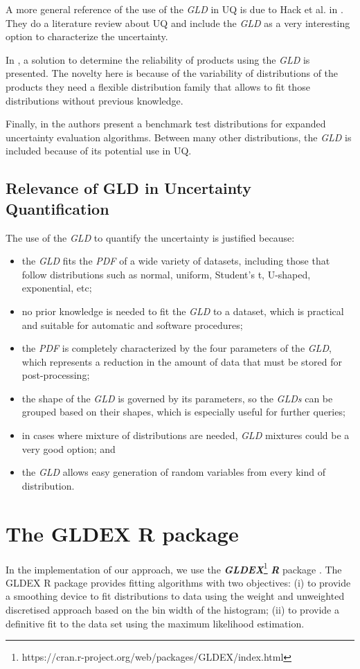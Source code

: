 A more general reference of the use of the \textit{GLD} in UQ is due to Hack et al. in \cite{da2012measurement}. They do a literature review about UQ and include the \textit{GLD} as a very interesting option to characterize the uncertainty.

In \cite{Movahedi2013}, a solution to determine the reliability of products using the \textit{GLD} is presented. The novelty here is because of the variability of distributions of the products they need a flexible distribution family that allows to fit those distributions without previous knowledge.

Finally, in \cite{Rajan2016} the authors present a benchmark test distributions for expanded uncertainty evaluation algorithms. Between many other distributions, the \textit{GLD} is included because of its potential use in UQ. 

\subsection{Relevance of GLD in Uncertainty Quantification}
The use of the \textit{GLD} to quantify the uncertainty is justified because: 
\begin{itemize}
\item the \textit{GLD} fits the \textit{PDF} of a wide variety of datasets, including those that follow distributions such as normal, uniform, Student's t, U-shaped, exponential, etc;
\item no prior knowledge is needed to fit the \textit{GLD} to a dataset, which is practical and suitable for automatic and software procedures;
\item the \textit{PDF} is completely characterized by the four parameters of the \textit{GLD}, which represents a reduction in the amount of data that must be stored for post-processing;
\item the shape of the \textit{GLD} is governed by its parameters, so the \textit{GLDs} can be grouped  based on their shapes, which is especially useful for further queries;
\item in cases where mixture of distributions are needed, \textit{GLD} mixtures could be a very good option; and
\item the \textit{GLD} allows easy generation of random variables from every kind of distribution.
\end{itemize}

\section{The GLDEX R package}\label{sec:gldex}
In the implementation of our approach, we use the \textbf{\textit{GLDEX}}\footnote{https://cran.r-project.org/web/packages/GLDEX/index.html} \textbf{\textit{R}} package \cite{Su2007}. The GLDEX R package provides fitting algorithms with two objectives: (i) to provide a smoothing device to fit distributions to data using the weight and unweighted discretised approach based on the bin width of the histogram; (ii)  to provide a definitive fit to the data set using the maximum likelihood estimation.

